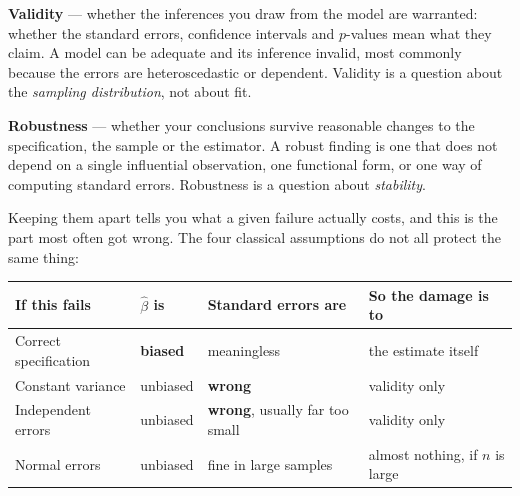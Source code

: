 \documentclass[
  letterpaper,
  10pt,
  twoside,
  openright,
  numbers=noenddot,
  chapterprefix=true]{scrbook}
\begin{document}
\begin{qmibdefinition}

{\textbf{Validity}} --- whether the inferences you draw from the model
are warranted: whether the standard errors, confidence intervals and
\(p\)-values mean what they claim. A model can be adequate and its
inference invalid, most commonly because the errors are heteroscedastic
or dependent. Validity is a question about the \emph{sampling
distribution}, not about fit.

\end{qmibdefinition}

\begin{qmibdefinition}

{\textbf{Robustness}} --- whether your conclusions survive reasonable
changes to the specification, the sample or the estimator. A robust
finding is one that does not depend on a single influential observation,
one functional form, or one way of computing standard errors. Robustness
is a question about \emph{stability}.

\end{qmibdefinition}

Keeping them apart tells you what a given failure actually costs, and
this is the part most often got wrong. The four classical assumptions do
not all protect the same thing:

\begin{longtable}[]{@{}
  >{\raggedright\arraybackslash}p{}
  >{\raggedright\arraybackslash}p{}
  >{\raggedright\arraybackslash}p{}
  >{\raggedright\arraybackslash}p{}@{}}
\toprule\noalign{}
\begin{minipage}[b]{\linewidth}\raggedright
If this fails
\end{minipage} & \begin{minipage}[b]{\linewidth}\raggedright
\(\hat\beta\) is
\end{minipage} & \begin{minipage}[b]{\linewidth}\raggedright
Standard errors are
\end{minipage} & \begin{minipage}[b]{\linewidth}\raggedright
So the damage is to
\end{minipage} \\
\midrule\noalign{}
\endhead
\bottomrule\noalign{}
\endlastfoot
Correct specification & \textbf{biased} & meaningless & the estimate
itself \\
Constant variance & unbiased & \textbf{wrong} & validity only \\
Independent errors & unbiased & \textbf{wrong}, usually far too small &
validity only \\
Normal errors & unbiased & fine in large samples & almost nothing, if
\(n\) is large \\
\end{longtable}
\end{document}
